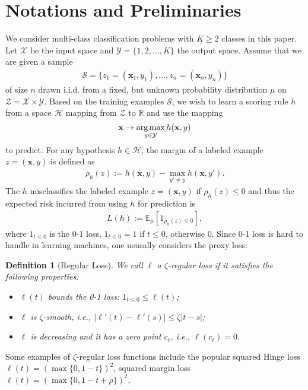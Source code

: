 \documentclass{article}
\newcommand{\argmax}{\operatornamewithlimits{arg\,max}}
\newtheorem{definition}{Definition}
\begin{document}
\section{Notations and Preliminaries}
We consider multi-class classification problems with $K\geq 2$ classes in this paper.
Let $\mathcal{X}$ be the input space and $\mathcal{Y}=\{1,2,\ldots,K\}$ the output space.
Assume that we are given a sample
\begin{align*}
  \mathcal{S}=\{z_1=(\mathbf  x_1,y_1),\ldots, z_n=(\mathbf  x_n,y_n)\}
\end{align*}
of size $n$ drawn i.i.d. from a fixed,
but unknown probability distribution $\mu$ on $\mathcal{Z}=\mathcal{X}\times\mathcal{Y}$.
Based on the training examples $\mathcal{S}$,
we wish to learn a scoring rule $h$ from a space $\mathcal{H}$ mapping from $\mathcal{Z}$ to $\mathbb{R}$
and use the mapping $$\mathbf x\rightarrow \argmax_{y\in\mathcal{Y}} h(\mathbf x,y)$$ to predict.
For any hypothesis $h\in\mathcal{H}$,
the margin of a labeled example $z=(\mathbf x,y)$ is defined as
\begin{align*}
  \rho_h(z):= h(\mathbf x,y)-\max_{y'\not =y} h(\mathbf x,y').
\end{align*}
The $h$ misclassifies the labeled example $z=(\mathbf x,y)$
if $\rho_h(z)\leq 0$ and thus the expected risk incurred
from using $h$ for prediction is
\begin{align*}
  L(h):=\mathbb{E}_\mu[1_{\rho_h(z)\leq 0}],
\end{align*}
where $1_{t\leq 0}$ is the 0-1 loss,
$1_{t\leq 0}=1$ if $t\leq 0$, otherwise 0.
Since 0-1 loss is hard to handle in learning machines,
one ususally considers the proxy loss:
\begin{definition}[Regular Loss]
  We call $\ell$ a $\zeta$-regular loss if it satisfies the following properties:
  \begin{itemize}
    \item[1)] $\ell(t)$ bounds the 0-1 loss: $1_{t\leq 0}\leq \ell(t)$;
    \item[2)] $\ell$ is $\zeta$-smooth, i.e., $|\ell'(t)-\ell'(s)|\leq \zeta|t-s|$;
    \item[3)] $\ell$ is decreasing and it has a zero point $c_\ell$, i.e., $\ell(c_\ell)=0$.
  \end{itemize}
\end{definition}
Some examples of $\zeta$-regular loss functions include the popular squared Hinge loss
$\ell(t)=\left(\max\{0,1-t\}\right)^2$, squared margin loss $\ell(t)=\left(\max\{0,1-t+\rho\}\right)^2$,
\end{document}
